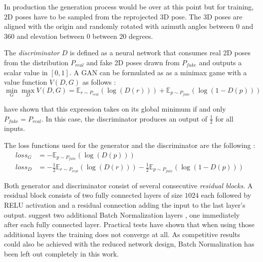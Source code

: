 In production the generation process would be over at this point but for training, 2D poses have to be sampled from the reprojected 3D pose.
The 3D poses are aligned with the origin and randomly rotated with azimuth angles between $0$ and $360$ and elevation between $0$ between $20$ degrees.

The \textit{discriminator} $D$ is defined as a neural network that consumes real 2D poses from the distribution $P_{real}$ and fake 2D poses drawn from $P_{fake}$ and outputs a scalar value in $[0, 1]$.
A GAN can be formulated as as a minimax game with a value function $V(D, G)$ as follows \cite{goodfellow14}: 
\begin{equation}
	\min_G \max_D V(D, G) = \mathbb{E}_{r\sim P_{real}}(\log(D(r))) + \mathbb{E}_{p\sim P_{fake}}(\log(1 - D(p)))
\end{equation}

\citet{goodfellow14} have shown that this expression takes on its global minimum if and only $P_{fake} = P_{real}$.
In this case, the discriminator produces an output of $\frac{1}{2}$ for all inputs.

The loss functions used for the generator and the discriminator are the following \cite{goodfellow17}:
\begin{align}
	\label{eq:generator-loss}
	loss_G &= -\mathbb{E}_{p\sim P_{fake}}(\log(D(p))) \\
	\label{eq:discriminator-loss}
	loss_D &= -\frac{1}{2}\mathbb{E}_{r\sim P_{real}}(\log(D(r))) - \frac{1}{2} \mathbb{E}_{p\sim P_{fake}}(\log(1 - D(p)))
\end{align}


Both generator and discriminator consist of several consecutive \textit{residual blocks}.
A residual block consists of two fully connected layers of size $1024$ each followed by RELU activation and a residual connection adding the input to the last layer's output.
\citet{drover18} suggest two additional Batch Normalization layers \cite{ioffe15}, one immediately after each fully connected layer.
Practical tests have shown that when using those additional layers the training does not converge at all.
As competitive results could also be achieved with the reduced network design, Batch Normalization has been left out completely in this work.

